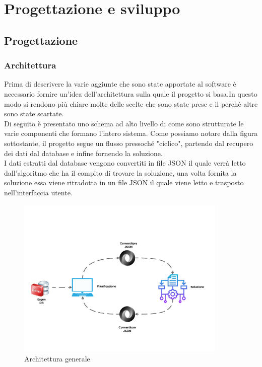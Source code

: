 
\chapter{Progettazione e sviluppo}
\label{cap:progettazione}

\section{Progettazione}
\subsection{Architettura}

Prima di descrivere la varie aggiunte che sono state apportate al software è necessario fornire un'idea dell'architettura sulla quale il progetto si basa.In questo modo si 
rendono più chiare molte delle scelte che sono state prese e il perchè altre sono state scartate.\\ Di seguito è presentato uno schema ad alto livello di come sono strutturate le
varie componenti che formano l'intero sistema. Come possiamo notare dalla figura sottostante, il progetto segue un flusso pressoché "ciclico", partendo dal recupero dei dati dal
database e infine fornendo la soluzione.\\ I dati estratti dal database vengono convertiti in file JSON il quale verrà letto dall'algoritmo che ha il compito di trovare la soluzione,
una volta fornita la soluzione essa viene ritradotta in un file JSON il quale viene letto e trasposto nell'interfaccia utente.

\begin{figure}[H]
	\includegraphics[width=10cm]{immagini/architettura.png}
	\centering
	\caption{Architettura generale}
\end{figure}

